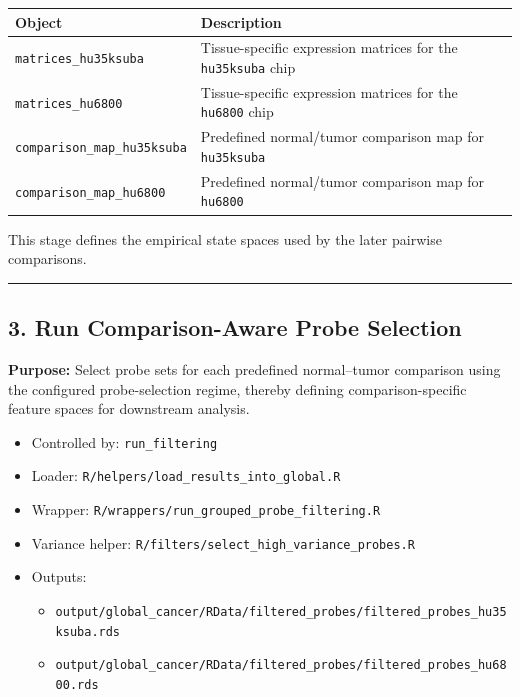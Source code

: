 \documentclass[
  letterpaper,
  DIV=11,
  numbers=noendperiod,
  openany,
  oneside]{scrreprt}
\providecommand{\tightlist}{%
  \setlength{\itemsep}{0pt}\setlength{\parskip}{0pt}}
\begin{document}
\begin{longtable}[]{@{}
  >{\raggedright\arraybackslash}p{}
  >{\raggedright\arraybackslash}p{}@{}}
\toprule\noalign{}
\begin{minipage}[b]{\linewidth}\raggedright
Object
\end{minipage} & \begin{minipage}[b]{\linewidth}\raggedright
Description
\end{minipage} \\
\midrule\noalign{}
\endhead
\bottomrule\noalign{}
\endlastfoot
\texttt{matrices\_hu35ksuba} & Tissue-specific expression matrices for
the \texttt{hu35ksuba} chip \\
\texttt{matrices\_hu6800} & Tissue-specific expression matrices for the
\texttt{hu6800} chip \\
\texttt{comparison\_map\_hu35ksuba} & Predefined normal/tumor comparison
map for \texttt{hu35ksuba} \\
\texttt{comparison\_map\_hu6800} & Predefined normal/tumor comparison
map for \texttt{hu6800} \\
\end{longtable}

This stage defines the empirical state spaces used by the later pairwise
comparisons.

\begin{center}\rule{0.5\linewidth}{0.5pt}\end{center}

\subsection*{3. Run Comparison-Aware Probe
Selection}\label{run-comparison-aware-probe-selection}

\textbf{Purpose:} Select probe sets for each predefined normal--tumor
comparison using the configured probe-selection regime, thereby defining
comparison-specific feature spaces for downstream analysis.

\begin{itemize}
\tightlist
\item
  Controlled by: \texttt{run\_filtering}
\item
  Loader: \texttt{R/helpers/load\_results\_into\_global.R}
\item
  Wrapper: \texttt{R/wrappers/run\_grouped\_probe\_filtering.R}
\item
  Variance helper: \texttt{R/filters/select\_high\_variance\_probes.R}
\item
  Outputs:

  \begin{itemize}
  \tightlist
  \item
    \texttt{output/global\_cancer/RData/filtered\_probes/filtered\_probes\_hu35ksuba.rds}
  \item
    \texttt{output/global\_cancer/RData/filtered\_probes/filtered\_probes\_hu6800.rds}
  \end{itemize}
\end{itemize}
\end{document}
